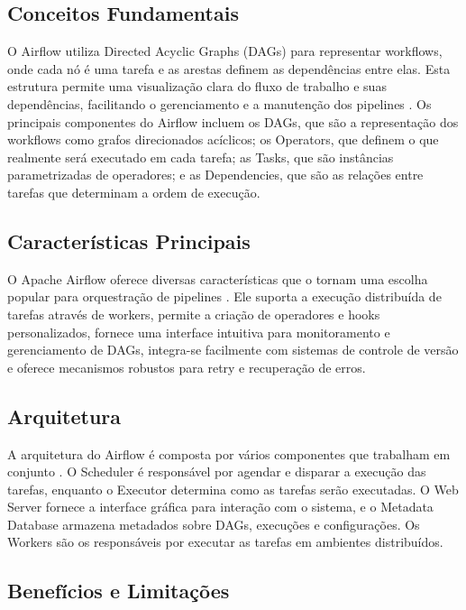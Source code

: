 \subsection{Conceitos Fundamentais}

O Airflow utiliza Directed Acyclic Graphs (DAGs) para representar workflows, onde cada nó é uma tarefa e as arestas definem as dependências entre elas. Esta estrutura permite uma visualização clara do fluxo de trabalho e suas dependências, facilitando o gerenciamento e a manutenção dos pipelines \cite{garcia2021airflow}. Os principais componentes do Airflow incluem os DAGs, que são a representação dos workflows como grafos direcionados acíclicos; os Operators, que definem o que realmente será executado em cada tarefa; as Tasks, que são instâncias parametrizadas de operadores; e as Dependencies, que são as relações entre tarefas que determinam a ordem de execução.

\subsection{Características Principais}

O Apache Airflow oferece diversas características que o tornam uma escolha popular para orquestração de pipelines \cite{kumar2022apache}. Ele suporta a execução distribuída de tarefas através de workers, permite a criação de operadores e hooks personalizados, fornece uma interface intuitiva para monitoramento e gerenciamento de DAGs, integra-se facilmente com sistemas de controle de versão e oferece mecanismos robustos para retry e recuperação de erros.

\subsection{Arquitetura}

A arquitetura do Airflow é composta por vários componentes que trabalham em conjunto \cite{sharma2021apache}. O Scheduler é responsável por agendar e disparar a execução das tarefas, enquanto o Executor determina como as tarefas serão executadas. O Web Server fornece a interface gráfica para interação com o sistema, e o Metadata Database armazena metadados sobre DAGs, execuções e configurações. Os Workers são os responsáveis por executar as tarefas em ambientes distribuídos.

\subsection{Benefícios e Limitações}

